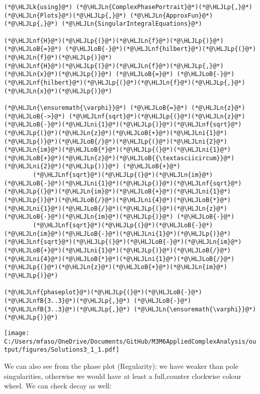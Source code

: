\documentclass[12pt,landscape]{article}
\newcommand{\HLJLk}[1]{\textcolor[RGB]{148,91,176}{\textbf{#1}}}
\newcommand{\HLJLn}[1]{#1}
\newcommand{\HLJLnf}[1]{\textcolor[RGB]{66,102,213}{#1}}
\newcommand{\HLJLnfB}[1]{\textcolor[RGB]{59,151,46}{#1}}
\newcommand{\HLJLni}[1]{\textcolor[RGB]{59,151,46}{#1}}
\newcommand{\HLJLoB}[1]{\textcolor[RGB]{102,102,102}{\textbf{#1}}}
\newcommand{\HLJLp}[1]{#1}
\begin{document}
{\begin{lstlisting}
(*@\HLJLk{using}@*) (*@\HLJLn{ComplexPhasePortrait}@*)(*@\HLJLp{,}@*) (*@\HLJLn{Plots}@*)(*@\HLJLp{,}@*) (*@\HLJLn{ApproxFun}@*)(*@\HLJLp{,}@*) (*@\HLJLn{SingularIntegralEquations}@*)

(*@\HLJLnf{H}@*)(*@\HLJLp{(}@*)(*@\HLJLn{f}@*)(*@\HLJLp{)}@*) (*@\HLJLoB{=}@*) (*@\HLJLoB{-}@*)(*@\HLJLnf{hilbert}@*)(*@\HLJLp{(}@*)(*@\HLJLn{f}@*)(*@\HLJLp{)}@*)
(*@\HLJLnf{H}@*)(*@\HLJLp{(}@*)(*@\HLJLn{f}@*)(*@\HLJLp{,}@*)(*@\HLJLn{x}@*)(*@\HLJLp{)}@*) (*@\HLJLoB{=}@*) (*@\HLJLoB{-}@*)(*@\HLJLnf{hilbert}@*)(*@\HLJLp{(}@*)(*@\HLJLn{f}@*)(*@\HLJLp{,}@*)(*@\HLJLn{x}@*)(*@\HLJLp{)}@*)

(*@\HLJLn{\ensuremath{\varphi}}@*) (*@\HLJLoB{=}@*) (*@\HLJLn{z}@*) (*@\HLJLoB{->}@*) (*@\HLJLnf{sqrt}@*)(*@\HLJLp{(}@*)(*@\HLJLn{z}@*)(*@\HLJLoB{-}@*)(*@\HLJLni{1}@*)(*@\HLJLp{)}@*)(*@\HLJLnf{sqrt}@*)(*@\HLJLp{(}@*)(*@\HLJLn{z}@*)(*@\HLJLoB{+}@*)(*@\HLJLni{1}@*)(*@\HLJLp{)}@*)(*@\HLJLoB{/}@*)(*@\HLJLp{(}@*)(*@\HLJLni{2}@*)(*@\HLJLn{im}@*)(*@\HLJLoB{*}@*)(*@\HLJLp{(}@*)(*@\HLJLni{1}@*)(*@\HLJLoB{+}@*)(*@\HLJLn{z}@*)(*@\HLJLoB{{\textasciicircum}}@*)(*@\HLJLni{2}@*)(*@\HLJLp{))}@*) (*@\HLJLoB{+}@*)
        (*@\HLJLnf{sqrt}@*)(*@\HLJLp{(}@*)(*@\HLJLn{im}@*)(*@\HLJLoB{-}@*)(*@\HLJLni{1}@*)(*@\HLJLp{)}@*)(*@\HLJLnf{sqrt}@*)(*@\HLJLp{(}@*)(*@\HLJLn{im}@*)(*@\HLJLoB{+}@*)(*@\HLJLni{1}@*)(*@\HLJLp{)}@*)(*@\HLJLoB{/}@*)(*@\HLJLni{4}@*)(*@\HLJLoB{*}@*)(*@\HLJLni{1}@*)(*@\HLJLoB{/}@*)(*@\HLJLp{(}@*)(*@\HLJLn{z}@*)(*@\HLJLoB{-}@*)(*@\HLJLn{im}@*)(*@\HLJLp{)}@*) (*@\HLJLoB{-}@*)
        (*@\HLJLnf{sqrt}@*)(*@\HLJLp{(}@*)(*@\HLJLoB{-}@*)(*@\HLJLn{im}@*)(*@\HLJLoB{-}@*)(*@\HLJLni{1}@*)(*@\HLJLp{)}@*)(*@\HLJLnf{sqrt}@*)(*@\HLJLp{(}@*)(*@\HLJLoB{-}@*)(*@\HLJLn{im}@*)(*@\HLJLoB{+}@*)(*@\HLJLni{1}@*)(*@\HLJLp{)}@*)(*@\HLJLoB{/}@*)(*@\HLJLni{4}@*)(*@\HLJLoB{*}@*)(*@\HLJLni{1}@*)(*@\HLJLoB{/}@*)(*@\HLJLp{(}@*)(*@\HLJLn{z}@*)(*@\HLJLoB{+}@*)(*@\HLJLn{im}@*)(*@\HLJLp{)}@*)

(*@\HLJLnf{phaseplot}@*)(*@\HLJLp{(}@*)(*@\HLJLoB{-}@*)(*@\HLJLnfB{3..3}@*)(*@\HLJLp{,}@*) (*@\HLJLoB{-}@*)(*@\HLJLnfB{3..3}@*)(*@\HLJLp{,}@*) (*@\HLJLn{\ensuremath{\varphi}}@*)(*@\HLJLp{)}@*)
\end{lstlisting}

\texttt{[image: C:/Users/mfaso/OneDrive/Documents/GitHub/M3M6AppliedComplexAnalysis/output/figures/Solutions3\_1\_1.pdf]}

We can also see from the phase plot (Regularity): we have weaker than pole singularities, otherwise we would have at least a full,counter clockwise colour wheel. We can check decay as well:


}
\end{document}
